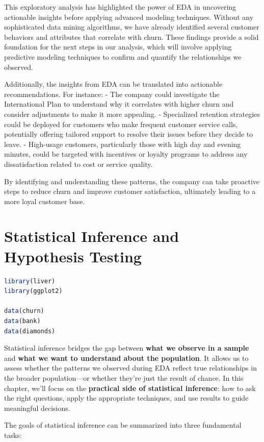 \documentclass[
]{book}
\theoremstyle{definition}
\theoremstyle{definition}
\theoremstyle{definition}
\theoremstyle{definition}
\theoremstyle{remark}
\begin{document}
This exploratory analysis has highlighted the power of EDA in uncovering actionable insights before applying advanced modeling techniques. Without any sophisticated data mining algorithms, we have already identified several customer behaviors and attributes that correlate with churn. These findings provide a solid foundation for the next steps in our analysis, which will involve applying predictive modeling techniques to confirm and quantify the relationships we observed.

Additionally, the insights from EDA can be translated into actionable recommendations. For instance:
- The company could investigate the International Plan to understand why it correlates with higher churn and consider adjustments to make it more appealing.
- Specialized retention strategies could be deployed for customers who make frequent customer service calls, potentially offering tailored support to resolve their issues before they decide to leave.
- High-usage customers, particularly those with high day and evening minutes, could be targeted with incentives or loyalty programs to address any dissatisfaction related to cost or service quality.

By identifying and understanding these patterns, the company can take proactive steps to reduce churn and improve customer satisfaction, ultimately leading to a more loyal customer base.

\chapter{Statistical Inference and Hypothesis Testing}\label{chapter-statistics}

\begin{lstlisting}[language=R]
library(liver)
library(ggplot2)   

data(churn) 
data(bank)
data(diamonds)
\end{lstlisting}

Statistical inference bridges the gap between \textbf{what we observe in a sample} and \textbf{what we want to understand about the population}. It allows us to assess whether the patterns we observed during EDA reflect true relationships in the broader population---or whether they're just the result of chance. In this chapter, we'll focus on the \textbf{practical side of statistical inference}: how to ask the right questions, apply the appropriate techniques, and use results to guide meaningful decisions.

The goals of statistical inference can be summarized into three fundamental tasks:
\end{document}
